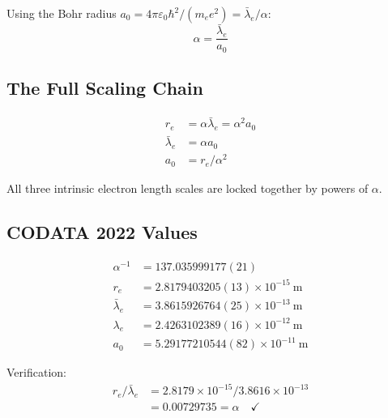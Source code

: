 \documentclass{article}
\begin{document}
Using the Bohr radius $a_0 = 4\pi\varepsilon_0\hbar^2/(m_e e^2) = \bar{\lambda}_e/\alpha$:
\begin{equation}
\alpha = \frac{\bar{\lambda}_e}{a_0}
\end{equation}

\subsection{The Full Scaling Chain}

\begin{align}
r_e &= \alpha \bar{\lambda}_e = \alpha^2 a_0 \\
\bar{\lambda}_e &= \alpha a_0 \\
a_0 &= r_e / \alpha^2
\end{align}

All three intrinsic electron length scales are locked together by powers of $\alpha$.

\subsection{CODATA 2022 Values}

\begin{align}
\alpha^{-1} &= 137.035999177(21) \\
r_e &= 2.8179403205(13) \times 10^{-15}\ \text{m} \\
\bar{\lambda}_e &= 3.8615926764(25) \times 10^{-13}\ \text{m} \\
\lambda_e &= 2.4263102389(16) \times 10^{-12}\ \text{m} \\
a_0 &= 5.29177210544(82) \times 10^{-11}\ \text{m}
\end{align}

Verification:
\begin{align}
r_e / \bar{\lambda}_e &= 2.8179\times 10^{-15} / 3.8616\times 10^{-13} \\
                      &= 0.00729735 = \alpha \quad \checkmark
\end{align}
\end{document}
